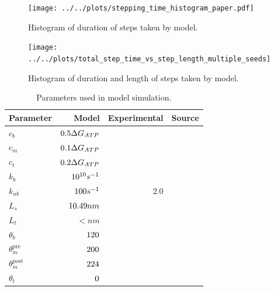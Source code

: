 \documentclass[9pt,twocolumn,twoside]{pnas-new}
\begin{document}
\begin{figure}%
\centering
\texttt{[image: ../../plots/stepping\_time\_histogram\_paper.pdf]}
\caption{Histogram of duration of steps taken by model.}
\label{fig:timehist}
\end{figure}

\begin{figure}%
\centering
\texttt{[image: ../../plots/total\_step\_time\_vs\_step\_length\_multiple\_seeds]}
\caption{Histogram of duration and length of steps taken by model.}
\label{fig:timehist}
\end{figure}

\begin{table}%
\centering
\caption{Parameters used in model simulation.}
\begin{tabular}{lrrr}
Parameter & Model & Experimental & Source \\
\midrule
$c_b$ & $0.5 \Delta G_{ATP}$ &  & \\
$c_m$ & $0.1 \Delta G_{ATP}$ &  & \\
$c_t$ & $0.2 \Delta G_{ATP}$ &  & \\
$k_b$ & $10^{10} s^{-1}$&  & \\
$k_{ub}$ & $100 s^{-1}$ & 2.0 & \\
$L_s$ & $10.49 nm$ & \cite{nativestructure} & \\
$L_t$ & $\lt nm$ & \cite{nativestructure} & \\
$\theta_b$ & $120$ &  & \\
$\theta_m^{\mbox{pre}}$ & $200$ &  & \\
$\theta_m^{\mbox{post}}$ & $224$ &  & \\
$\theta_t$ & $0$ &  & \\

\bottomrule
\end{tabular}

\end{table}
\end{document}
